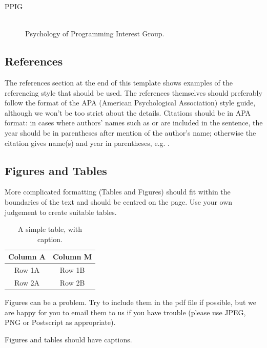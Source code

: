 \documentclass{ppig}
\begin{document}
\begin{description}
    \item [PPIG] \hfill \\
        Psychology of Programming Interest Group.
\end{description}


\subsection{References}

The references section at the end of this template shows examples of the
referencing style that should be used. The references themselves should
preferably follow the format of the APA (American Psychological Association)
style guide, although we won't be too strict about the details. Citations
should be in APA format: in cases where authors' names such as  or
 are included in the sentence, the year
should be in parentheses after mention of the author's name; otherwise the
citation gives name(s) and year in parentheses, e.g. \cite{RyanFoster81}.


\subsection{Figures and Tables}

More complicated formatting (Tables and Figures) should fit within the
boundaries of the text and should be centred on the page. Use your own
judgement to create suitable tables.

\begin{table}
\begin{center}
\caption{A simple table, with caption.}
\begin{tabular}{|c|c|} \hline
Column A & Column M \\ \hline
Row 1A & Row 1B \\ \hline
Row 2A & Row 2B \\ \hline
\end{tabular}
\label{tbl:sample-table}
\end{center}
\end{table}

Figures can be a problem. Try to include them in the pdf file if possible, but
we are happy for you to email them to us if you have trouble (please use JPEG,
PNG or Postscript as appropriate).

Figures and tables should have captions.
\end{document}
